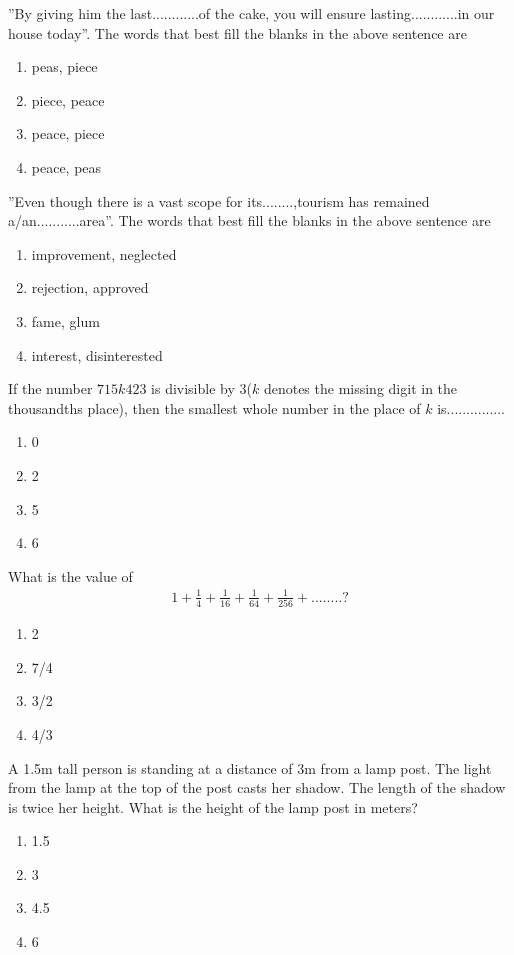 \item ''By giving him the last............of the cake, you will ensure lasting............in our house today''. The words that best fill the blanks in the above sentence are
\begin{enumerate}
\item peas, piece
\item piece, peace
\item peace, piece
\item peace, peas
\end{enumerate}

\item ''Even though there is a vast scope for its........,tourism has remained a/an...........area''. The words that best fill the blanks in the above sentence are
\begin{enumerate}
\item improvement, neglected
\item rejection, approved
\item fame, glum
\item interest, disinterested
\end{enumerate} 

\item If the number $715k423$ is divisible by 3($k$ denotes the missing digit in the thousandths place), then the smallest whole number in the place of $k$ is...............
\begin{enumerate}
\item 0
\item 2
\item 5
\item 6
\end{enumerate}

\item What is the value of 
\begin{align*}
1 + \frac{1}{4} + \frac{1}{16} + \frac{1}{64} + \frac{1}{256} + ........?
\end{align*}
\begin{enumerate}
\item 2
\item 7/4
\item 3/2
\item 4/3
\end{enumerate}

\item A 1.5m tall person is standing at a distance of 3m from a lamp post. The light from the lamp at the top of the post casts her shadow. The length of the shadow is twice her height. What is the height of the lamp post in meters?
\begin{enumerate}
\item 1.5
\item 3
\item 4.5
\item 6
\end{enumerate}

